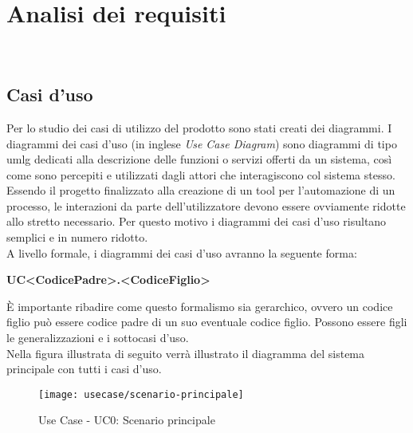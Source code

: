 
\chapter{Analisi dei requisiti}
\label{cap:analisi-requisiti}

\noindent {}\\

\section{Casi d'uso}

\noindent Per lo studio dei casi di utilizzo del prodotto sono stati creati dei diagrammi.
I diagrammi dei casi d'uso (in inglese \emph{Use Case Diagram}) sono diagrammi di tipo \gls{umlg} dedicati alla descrizione delle funzioni o servizi offerti da un sistema, così come sono percepiti e utilizzati dagli attori che interagiscono col sistema stesso.
Essendo il progetto finalizzato alla creazione di un tool per l'automazione di un processo, le interazioni da parte dell'utilizzatore devono essere ovviamente ridotte allo stretto necessario. Per questo motivo i diagrammi dei casi d'uso risultano semplici e in numero ridotto.\\

\noindent A livello formale, i diagrammi dei casi d'uso avranno la seguente forma:
\begin{center}
    \textbf{UC<CodicePadre>.<CodiceFiglio>}
\end{center}
\noindent È importante ribadire come questo formalismo sia gerarchico, ovvero un codice figlio
può essere codice padre di un suo eventuale codice figlio. Possono essere figli le generalizzazioni e i sottocasi d'uso.\\

\noindent Nella figura illustrata di seguito verrà illustrato il diagramma del sistema principale con tutti i casi d'uso.
\begin{figure}[!h] 
    \centering 
    \texttt{[image: usecase/scenario-principale]} 
    \caption{Use Case - UC0: Scenario principale}
\end{figure}


